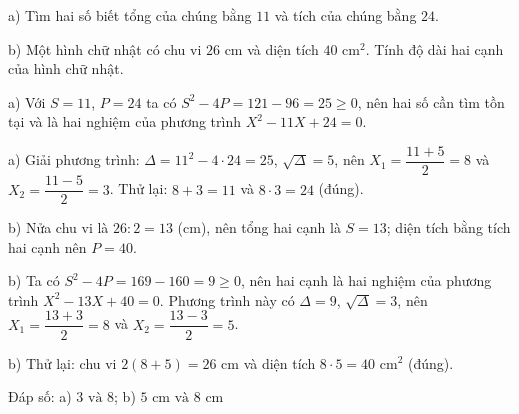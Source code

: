 \begin{problem}[9DS-PT2-037]
a) Tìm hai số biết tổng của chúng bằng $11$ và tích của chúng bằng $24$.

b) Một hình chữ nhật có chu vi $26$ cm và diện tích $40$ cm$^2$. Tính độ dài hai cạnh của hình chữ nhật.

\begin{solution}
a) Với $S = 11$, $P = 24$ ta có $S^2 - 4P = 121 - 96 = 25 \geq 0$, nên hai số cần tìm tồn tại và là hai nghiệm của phương trình $X^2 - 11X + 24 = 0$.

a) Giải phương trình: $\Delta = 11^2 - 4 \cdot 24 = 25$, $\sqrt{\Delta} = 5$, nên $X_1 = \dfrac{11 + 5}{2} = 8$ và $X_2 = \dfrac{11 - 5}{2} = 3$. Thử lại: $8 + 3 = 11$ và $8 \cdot 3 = 24$ (đúng).

b) Nửa chu vi là $26 : 2 = 13$ (cm), nên tổng hai cạnh là $S = 13$; diện tích bằng tích hai cạnh nên $P = 40$.

b) Ta có $S^2 - 4P = 169 - 160 = 9 \geq 0$, nên hai cạnh là hai nghiệm của phương trình $X^2 - 13X + 40 = 0$. Phương trình này có $\Delta = 9$, $\sqrt{\Delta} = 3$, nên $X_1 = \dfrac{13 + 3}{2} = 8$ và $X_2 = \dfrac{13 - 3}{2} = 5$.

b) Thử lại: chu vi $2(8 + 5) = 26$ cm và diện tích $8 \cdot 5 = 40$ cm$^2$ (đúng).

Đáp số: a) $\boxed{3 \text{ và } 8}$; b) $\boxed{5 \text{ cm và } 8 \text{ cm}}$
\end{solution}
\end{problem}

